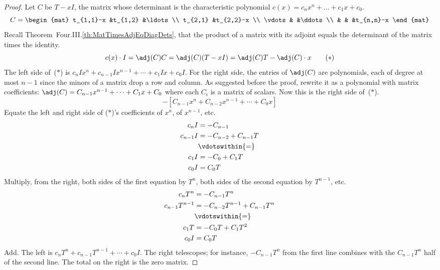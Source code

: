 \begin{proof}
Let \( C \) be \( T-xI \),
the matrix whose determinant is the characteristic polynomial
\( c(x)=c_nx^n+\dots+c_1x+c_0 \).
\begin{equation*}
  C=\begin{mat}
    t_{1,1}-x        &t_{1,2}   &\ldots        \\
    t_{2,1}          &t_{2,2}-x               \\
    \vdots           &          &\ddots       \\
                     &          &       &t_{n,n}-x
  \end{mat}
\end{equation*}
Recall Theorem~Four.III.\ref{th:MatTimesAdjEqDiagDets},
that the product of a matrix with its adjoint equals
the determinant of the matrix times the identity.
\begin{equation*}
  c(x)\cdot I
  =\adj (C)C
  =\adj (C)(T-xI)
  =\adj (C)T- \adj(C)\cdot x
\tag*{($*$)}
\end{equation*}
The left side of~($*$) is 
$c_nIx^n+c_{n-1}Ix^{n-1}+\cdots+c_1Ix+c_0I$.
For the right side,
the entries of \( \adj (C) \) are polynomials, each of degree
at most \( n-1 \) since the minors of a matrix drop a row and column.
As suggested before the proof, rewrite it as a polynomial with
matrix coefficients:
\( \adj (C)=C_{n-1}x^{n-1}+\cdots+C_1x+C_0 \)
where each \( C_i \) is a matrix of scalars.
Now this is the right side of~($*$).
\begin{equation*}
  [(C_{n-1}T)x^{n-1}+\cdots+(C_1T)x+C_0T]  
   -[C_{n-1}x^n+C_{n-2}x^{n-1}+\cdots+C_0x]
\end{equation*}
Equate the left and right side of ($*$)'s
coefficients of \( x^n \), of $x^{n-1}$, etc.
\begin{align*}
  c_nI
  &=-C_{n-1}    \\
  c_{n-1}I
  &=-C_{n-2}+C_{n-1}T    \\
  &\vdotswithin{=}             \\
  c_{1}I
  &=-C_{0}+C_{1}T    \\
  c_{0}I
  &=C_{0}T
\end{align*}
Multiply, from the right, both sides of the first equation by \( T^n \), 
both sides of the second equation by \( T^{n-1} \), etc.
\begin{align*}
  c_nT^n
  &=-C_{n-1}T^n    \\
  c_{n-1}T^{n-1}
  &=-C_{n-2}T^{n-1}+C_{n-1}T^n    \\
  &\vdotswithin{=}             \\
  c_{1}T
  &=-C_{0}T+C_{1}T^2    \\
  c_{0}I
  &=C_{0}T
\end{align*}
Add.
The left is 
\( c_nT^n+c_{n-1}T^{n-1}+\cdots+c_0I \). 
The right telescopes;
for instance, $-C_{n-1}T^n$ from the first line combines with the 
$C_{n-1}T^n$ half of the second line. 
The total on the right is the zero matrix.
\end{proof}

